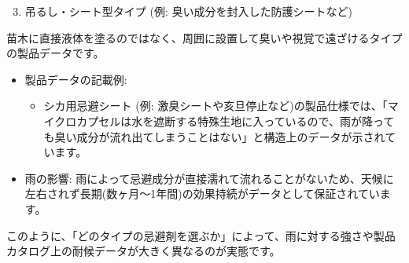 \documentclass[a4paper, 11pt]{jsarticle}
\begin{document}
\begin{enumerate}
    \setcounter{enumi}{2}
    \item 吊るし・シート型タイプ (例: 臭い成分を封入した防護シートなど)
\end{enumerate}
苗木に直接液体を塗るのではなく、周囲に設置して臭いや視覚で遠ざけるタイプの製品データです。
\begin{itemize}
    \item 製品データの記載例:
    \begin{itemize}
        \item[○] シカ用忌避シート (例: 激臭シートや亥旦停止など)の製品仕様では、「マイクロカプセルは水を遮断する特殊生地に入っているので、雨が降っても臭い成分が流れ出てしまうことはない」と構造上のデータが示されています\cite{ref19}。
    \end{itemize}
    \item 雨の影響: 雨によって忌避成分が直接濡れて流れることがないため、天候に左右されず長期(数ヶ月〜1年間)の効果持続がデータとして保証されています。
\end{itemize}
このように、「どのタイプの忌避剤を選ぶか」によって、雨に対する強さや製品カタログ上の耐候データが大きく異なるのが実態です。
\end{document}
